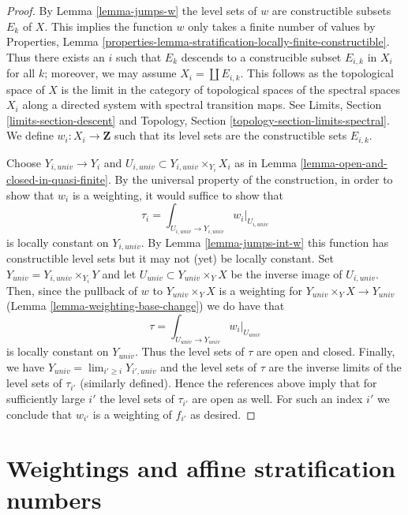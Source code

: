 \begin{proof}
By Lemma \ref{lemma-jumps-w} the level sets of $w$ are constructible subsets
$E_k$ of $X$. This implies the function $w$ only takes a finite number
of values by Properties, Lemma
\ref{properties-lemma-stratification-locally-finite-constructible}.
Thus there exists an $i$ such that $E_k$ descends to a construcible
subset $E_{i, k}$ in $X_i$ for all $k$; moreover, we may assume
$X_i = \coprod E_{i, k}$. This follows as the topological space
of $X$ is the limit in the category of topological spaces
of the spectral spaces $X_i$ along a directed system with
spectral transition maps. See
Limits, Section \ref{limits-section-descent}
and
Topology, Section \ref{topology-section-limits-spectral}.
We define $w_i : X_i \to \mathbf{Z}$ such that its level
sets are the constructible sets $E_{i, k}$.

\medskip\noindent
Choose $Y_{i, univ} \to Y_i$ and
$U_{i, univ} \subset Y_{i, univ} \times_{Y_i} X_i$
as in Lemma \ref{lemma-open-and-closed-in-quasi-finite}.
By the universal property of the construction, in order to
show that $w_i$ is a weighting, it would suffice to show
that
$$
\tau_i = \textstyle{\int}_{U_{i, univ} \to Y_{i, univ}} w_i|_{U_{i, univ}}
$$
is locally constant on $Y_{i, univ}$. By Lemma \ref{lemma-jumps-int-w}
this function has constructible level sets but it may
not (yet) be locally constant. Set
$Y_{univ} = Y_{i, univ} \times_{Y_i} Y$
and let $U_{univ} \subset Y_{univ} \times_Y X$
be the inverse image of $U_{i, univ}$.
Then, since the pullback of $w$ to $Y_{univ} \times_Y X$
is a weighting for $Y_{univ} \times_Y X \to Y_{univ}$
(Lemma \ref{lemma-weighting-base-change})
we do have that
$$
\tau = \textstyle{\int}_{U_{univ} \to Y_{univ}} w_i|_{U_{univ}}
$$
is locally constant on $Y_{univ}$. Thus the level sets of
$\tau$ are open and closed. Finally, we have
$Y_{univ} = \lim_{i' \geq i} Y_{i', univ}$
and the level sets of $\tau$ are the inverse limits of the
level sets of $\tau_{i'}$ (similarly defined).
Hence the references above imply that for sufficiently
large $i'$ the level sets of $\tau_{i'}$ are open as well.
For such an index $i'$ we conclude that $w_{i'}$
is a weighting of $f_{i'}$ as desired.
\end{proof}







\section{Weightings and affine stratification numbers}
\label{section-bounds-asn}

